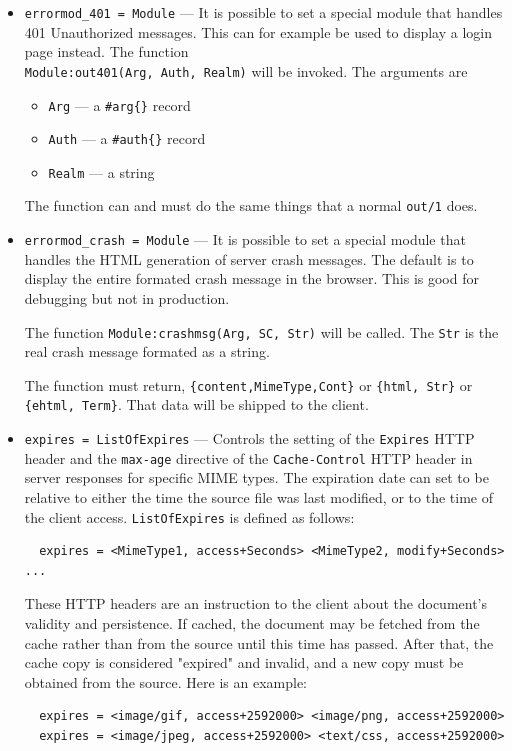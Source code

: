 \documentclass[11pt,oneside,english]{book}
\begin{document}
\begin{itemize}
\item       \verb+errormod_401 = Module+ ---
              It is possible to set a special module that handles 401
              Unauthorized messages. This can for example be used to display a
              login page instead. The function \\
              \verb+Module:out401(Arg, Auth, Realm)+ will be invoked. The
              arguments are
              \begin{itemize}
              \item \verb+Arg+ --- a \verb+#arg{}+ record
              \item \verb+Auth+ --- a \verb+#auth{}+ record
              \item \verb+Realm+ --- a string
              \end{itemize}
              The function can and must do the same things that a normal
              \verb+out/1+ does.

\item       \verb+errormod_crash = Module+ ---
              It is possible to set a special module that handles the HTML
              generation of server crash messages. The default is to display the
              entire formated crash message in the browser. This is good for
              debugging but not in production.

              The function \verb+Module:crashmsg(Arg, SC, Str)+ will be
              called. The \verb+Str+ is the real crash message formated as a
              string.

              The function must return, \verb+{content,MimeType,Cont}+ or
              \verb+{html, Str}+ or \verb+{ehtml, Term}+. That data will be
              shipped to the client.

\item       \verb+expires = ListOfExpires+ ---
              Controls the setting of the \verb+Expires+ HTTP header and the
              \verb+max-age+ directive of the \verb+Cache-Control+ HTTP header
              in server responses for specific MIME types. The expiration date
              can set to be relative to either the time the source file was last
              modified, or to the time of the client
              access. \verb+ListOfExpires+ is defined as follows:
\begin{verbatim}
  expires = <MimeType1, access+Seconds> <MimeType2, modify+Seconds> ...
\end{verbatim}
              These HTTP headers are an instruction to the client about the
              document's validity and persistence. If cached, the document may
              be fetched from the cache rather than from the source until this
              time has passed. After that, the cache copy is considered
              "expired" and invalid, and a new copy must be obtained from the
              source.
              Here is an example:
\begin{verbatim}
  expires = <image/gif, access+2592000> <image/png, access+2592000>
  expires = <image/jpeg, access+2592000> <text/css, access+2592000>
\end{verbatim}


\end{itemize}
\end{document}
